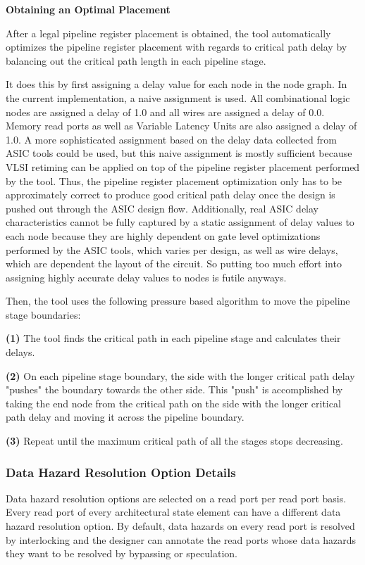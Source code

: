 {\bf Obtaining an Optimal Placement}

After a legal pipeline register placement is obtained, the tool automatically optimizes the pipeline register placement with regards to critical path delay by balancing out the critical path length in each pipeline stage. 

It does this by first assigning a delay value for each node in the node graph. In the current implementation, a naive assignment is used. All combinational logic nodes are assigned a delay of 1.0 and all wires are assigned a delay of 0.0. Memory read ports as well as Variable Latency Units are also assigned a delay of 1.0. A more sophisticated assignment based on the delay data collected from ASIC tools could be used, but this naive assignment is mostly sufficient because VLSI retiming can be applied on top of the pipeline register placement performed by the tool. Thus, the pipeline register placement optimization only has to be approximately correct to produce good critical path delay once the design is pushed out through the ASIC design flow. Additionally, real ASIC delay characteristics cannot be fully captured by a static assignment of delay values to each node because they are highly dependent on gate level optimizations performed by the ASIC tools, which varies per design, as well as wire delays, which are dependent the layout of the circuit. So putting too much effort into assigning highly accurate delay values to nodes is futile anyways. 

Then, the tool uses the following pressure based algorithm to move the pipeline stage boundaries:

{\bf (1)} The tool finds the critical path in each pipeline stage and calculates their delays.

{\bf (2)} On each pipeline stage boundary, the side with the longer critical path delay "pushes" the boundary towards the other side. This "push" is accomplished by taking the end node from the critical path on the side with the longer critical path delay and moving it across the pipeline boundary.

{\bf (3)} Repeat until the maximum critical path of all the stages stops decreasing.

\subsubsection{Data Hazard Resolution Option Details}
\label{section:logicGen}
Data hazard resolution options are selected on a read port per read port basis. Every read port of every architectural state element can have a different data hazard resolution option. By default, data hazards on every read port is resolved by interlocking and the designer can annotate the read ports whose data hazards they want to be resolved by bypassing or speculation.

